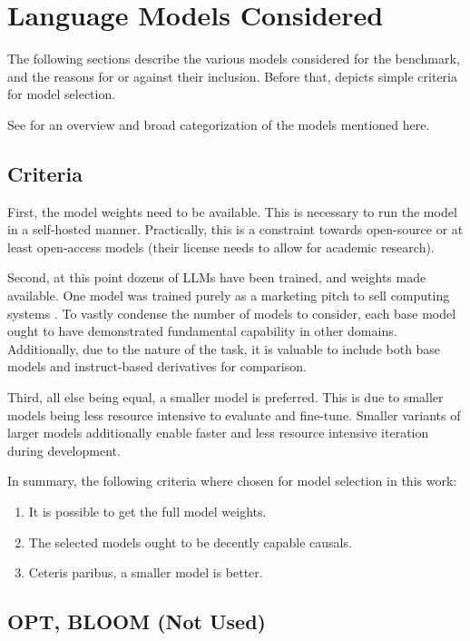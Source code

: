 \section{Language Models Considered}\label{sec:models}
The following sections describe the various models considered for the benchmark, and the reasons for or against their inclusion.
Before that,  depicts simple criteria for model selection.

See  for an overview and broad categorization of the models mentioned here.


\subsection{Criteria}\label{sub:criteria}
First, the model weights need to be available.
This is necessary to run the model in a self-hosted manner.
Practically, this is a constraint towards open-source or at least open-access models (their license needs to allow for academic research).

Second, at this point dozens of \glspl{LLM} have been trained, and weights made available.
One model was trained purely as a marketing pitch to sell computing systems \cite{dey_cerebrasgpt_2023}.
To vastly condense the number of models to consider, each base model ought to have demonstrated fundamental capability in other domains.
Additionally, due to the nature of the task, it is valuable to include both base models and instruct-based derivatives for comparison.

Third, all else being equal, a smaller model is preferred.
This is due to smaller models being less resource intensive to evaluate and fine-tune.
Smaller variants of larger models additionally enable faster and less resource intensive iteration during development.

In summary, the following criteria where chosen for model selection in this work:
\begin{enumerate}
    \item It is possible to get the full model weights.
    \item The selected models ought to be decently capable \glspl{causal}.
    \item Ceteris paribus, a smaller model is better.
\end{enumerate}



\subsection{OPT, BLOOM (Not Used)}
